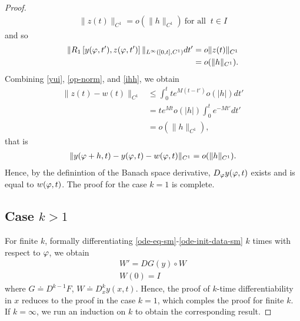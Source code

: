 \begin{proof}
\begin{equation*}
\begin{split}
  \| z(t) \|_{C^{1}}  =  o (\| h \|_{C^{1}} ) \ \text{for all } \ t \in I
\end{split}
\end{equation*}
%
%
and so
%
\begin{equation}
  \begin{split}
    \label{ihh}
    \| R_{1}\left[ y(\varphi,t'), z(\varphi,t')
    \right] \|_{L^{\infty}\left( [0,t], C^{1} \right)} dt' 
    & = o\| z(t) \|_{C^{1}} 
    \\
    & = o(\| h \|_{C^{1}}).
  \end{split}
\end{equation}
%
%
%
Combining \eqref{yui}, \eqref{op-norm}, and \eqref{ihh}, we obtain
%
%
\begin{equation*}
\begin{split}
  \| z(t) - w(t) \|_{C^{1}} 
  & \le \int_{0}^{t} t e^{M(t - t')} o(| h
  |) dt'
  \\
  & = te^{Mt} o(| h |) \int_{0}^{t} e^{-Mt'} dt'
  \\
  & = o(\| h \|_{C^{1}}),
\end{split}
\end{equation*}
%
%
that is
%
%
\begin{equation*}
\begin{split}
  \| y(\varphi + h, t) - y(\varphi,t) - w(\varphi,t) \|_{C^{1}} = o(\| h \|_{C^{1}}).
\end{split}
\end{equation*}
%
%
Hence, by the definintion of the Banach space derivative, $D_{\varphi}y(\varphi,t)$
exists and is equal to $w(\varphi,t)$. The proof for the case $k=1$ is complete.
\subsection{Case $k >1$} 
\label{ssec:case-kg1}
For finite $k$, formally differentiating
\eqref{ode-eq-sm}-\eqref{ode-init-data-sm}
$k$ times with respect to $\varphi$, we obtain
\begin{gather*}
  W' = DG(y) \circ W
  \\
  W(0) = I
\end{gather*}
where $G \doteq D^{k-1}F$, $W \doteq D_{x}^{k} y(x,t)$. Hence, the proof of
$k$-time differentiability in $x$ reduces to the proof in the case $k=1$, which
comples the proof for finite $k$. If $k = \infty$, we run an induction on $k$ to
obtain the corresponding result.
\end{proof}

%
